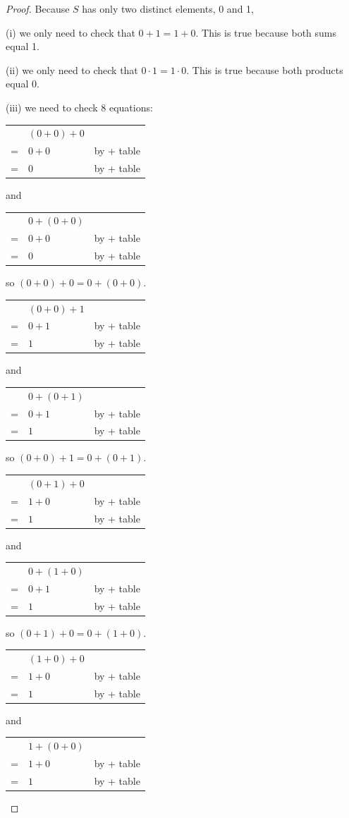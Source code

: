 \documentclass[14pt]{extarticle}
\newcommand{\cy}{\color{cyan}}
\begin{document}
\begin{proof}
Because $S$ has only two distinct elements, 0 and 1,

(i) we only need to check that \(0 + 1 = 1 + 0\). This is true because both sums equal 1.

(ii) we only need to check that \(0 \cdot 1 = 1 \cdot 0\). This is true because both products equal 0.

(iii) we need to check 8 equations:

\begin{tabular}{cll}
  & \((0 + 0) + 0\) & \\
= & \(0 + 0\) & {\cy by + table} \\
= & \(0\) & {\cy by + table}
\end{tabular}
and
\begin{tabular}{cll}
  & \(0 + (0 + 0)\) & \\
= & \(0 + 0\) & {\cy by + table} \\
= & \(0\) & {\cy by + table}
\end{tabular}

so \((0 + 0) + 0 = 0 + (0 + 0)\).

\begin{tabular}{cll}
  & \((0 + 0) + 1\) & \\
= & \(0 + 1\) & {\cy by + table} \\
= & \(1\) & {\cy by + table}
\end{tabular}
and
\begin{tabular}{cll}
  & \(0 + (0 + 1)\) & \\
= & \(0 + 1\) & {\cy by + table} \\
= & \(1\) & {\cy by + table}
\end{tabular}

so \((0 + 0) + 1 = 0 + (0 + 1)\).

\begin{tabular}{cll}
  & \((0 + 1) + 0\) & \\
= & \(1 + 0\) & {\cy by + table} \\
= & \(1\) & {\cy by + table}
\end{tabular}
and
\begin{tabular}{cll}
  & \(0 + (1 + 0)\) & \\
= & \(0 + 1\) & {\cy by + table} \\
= & \(1\) & {\cy by + table}
\end{tabular}

so \((0 + 1) + 0 = 0 + (1 + 0)\).

\begin{tabular}{cll}
  & \((1 + 0) + 0\) & \\
= & \(1 + 0\) & {\cy by + table} \\
= & \(1\) & {\cy by + table}
\end{tabular}
and
\begin{tabular}{cll}
  & \(1 + (0 + 0)\) & \\
= & \(1 + 0\) & {\cy by + table} \\
= & \(1\) & {\cy by + table}
\end{tabular}


\end{proof}
\end{document}
